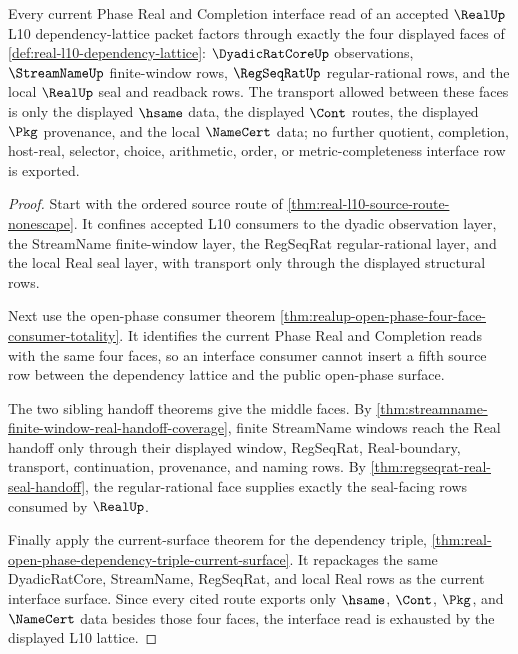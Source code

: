 \begin{theorem}
\label{thm:real-l10-dependency-lattice-interface-totality}
Every current Phase Real and Completion interface read of an accepted $\RealUp$
L10 dependency-lattice packet factors through exactly the four displayed
faces of \autoref{def:real-l10-dependency-lattice}: $\DyadicRatCoreUp$
observations, $\StreamNameUp$ finite-window rows, $\RegSeqRatUp$
regular-rational rows, and the local $\RealUp$ seal and readback rows. The
transport allowed between these faces is only the displayed $\hsame$ data,
the displayed $\Cont$ routes, the displayed $\Pkg$ provenance, and the local
$\NameCert$ data; no further quotient, completion, host-real, selector,
choice, arithmetic, order, or metric-completeness interface row is exported.
\end{theorem}
\begin{proof}
Start with the ordered source route of
\autoref{thm:real-l10-source-route-nonescape}. It confines accepted L10
consumers to the dyadic observation layer, the StreamName finite-window
layer, the RegSeqRat regular-rational layer, and the local Real seal layer,
with transport only through the displayed structural rows.

Next use the open-phase consumer theorem
\autoref{thm:realup-open-phase-four-face-consumer-totality}. It identifies
the current Phase Real and Completion reads with the same four faces, so an
interface consumer cannot insert a fifth source row between the dependency
lattice and the public open-phase surface.

The two sibling handoff theorems give the middle faces. By
\autoref{thm:streamname-finite-window-real-handoff-coverage}, finite
StreamName windows reach the Real handoff only through their displayed
window, RegSeqRat, Real-boundary, transport, continuation, provenance, and
naming rows. By \autoref{thm:regseqrat-real-seal-handoff}, the
regular-rational face supplies exactly the seal-facing rows consumed by
$\RealUp$.

Finally apply the current-surface theorem for the dependency triple,
\autoref{thm:real-open-phase-dependency-triple-current-surface}. It
repackages the same DyadicRatCore, StreamName, RegSeqRat, and local Real rows
as the current interface surface. Since every cited route exports only
$\hsame$, $\Cont$, $\Pkg$, and $\NameCert$ data besides those four faces, the
interface read is exhausted by the displayed L10 lattice.
\end{proof}

